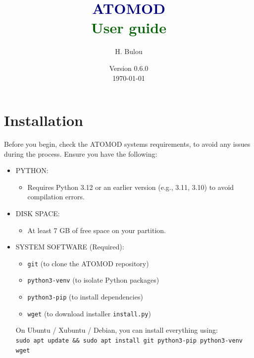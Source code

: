 \documentclass[12pt,a4paper,french]{book}
\title{\Huge\textbf{\textcolor{darkblue}{ATOMOD}}\\
       \Large\textcolor{darkgreen}{User guide}\\
       }
\author{H. Bulou}
\date{Version 0.6.0 \\ \today}
\begin{document}
\maketitle
\newpage
\thispagestyle{empty}
\mbox{}

\section*{Installation}
Before you begin, check the ATOMOD systems requirements, to avoid any issues during the process.
Ensure you have the following:
\begin{itemize}
	\item PYTHON:
	\begin{itemize}
		\item Requires Python 3.12 or an earlier version (e.g., 3.11, 3.10) to avoid compilation errors. 
	\end{itemize}
	\item DISK SPACE:
	\begin{itemize}
		\item 	At least 7 GB of free space on your partition. 
	\end{itemize}
	\item SYSTEM SOFTWARE (Required):
	\begin{itemize}
		\item \verb+git+          (to clone the ATOMOD repository)
		\item \verb+python3-venv+ (to isolate Python packages)
		\item \verb+python3-pip+  (to install dependencies)
		\item  \verb+wget+         (to download installer \verb+install.py+)
	\end{itemize}
	On Ubuntu / Xubuntu / Debian, you can install everything using:\\
	\verb+sudo apt update && sudo apt install git python3-pip python3-venv wget+
	
\end{itemize}
\end{document}
